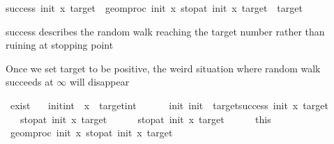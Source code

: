 \begin{isabellebody}
{\isachardoublequoteopen}success\ init\ x\ target\ {\isacharequal}{\kern0pt}\ {\isacharparenleft}{\kern0pt}geom{\isacharunderscore}{\kern0pt}proc\ init\ x\ {\isacharparenleft}{\kern0pt}stop{\isacharunderscore}{\kern0pt}at\ init\ x\ target{\isacharparenright}{\kern0pt}\ {\isacharequal}{\kern0pt}\ target{\isacharparenright}{\kern0pt}{\isachardoublequoteclose}%
\begin{isamarkuptext}%
success describes the random walk reaching the target number rather than ruining at stopping point%
\end{isamarkuptext}\isamarkuptrue%
%
\isadelimdocument
%
\endisadelimdocument
%
\isatagdocument
%
\isamarkuptrue%
%
\isamarkuptrue%
%
\endisatagdocument
{\isafolddocument}%
%
\isadelimdocument
%
\endisadelimdocument
%
\begin{isamarkuptext}%
Once we set target to be positive, the weird situation where random walk succeeds at $\infty$ will disappear%
\end{isamarkuptext}\isamarkuptrue%
\isamarkupfalse%
\ exist{\isacharcolon}{\kern0pt}\isanewline
\ \ \ init{\isacharcolon}{\kern0pt}{\isacharcolon}{\kern0pt}int\ \ x\ \ target{\isacharcolon}{\kern0pt}{\isacharcolon}{\kern0pt}int\ \isanewline
\ \ \ {\isachardoublequoteopen}{}\ {\isasymle}\ init{\isachardoublequoteclose}\ {\isachardoublequoteopen}init\ {\isasymle}\ target{\isachardoublequoteclose}{\isachardoublequoteopen}success\ init\ x\ target{\isachardoublequoteclose}\isanewline
\ \ \ {\isachardoublequoteopen}stop{\isacharunderscore}{\kern0pt}at\ init\ x\ target\ {\isasymnoteq}\ {\isasyminfinity}{\isachardoublequoteclose}\isanewline
%
\isadelimproof
%
\endisadelimproof
%
\isatagproof
{}\isamarkupfalse%
\isanewline
\ \ \isamarkupfalse%
\ {\isachardoublequoteopen}stop{\isacharunderscore}{\kern0pt}at\ init\ x\ target\ {\isacharequal}{\kern0pt}\ {\isasyminfinity}{\isachardoublequoteclose}\isanewline
\ \ \isamarkupfalse%
\ this\ \isamarkupfalse%
\ {\isachardoublequoteopen}geom{\isacharunderscore}{\kern0pt}proc\ init\ x\ {\isacharparenleft}{\kern0pt}stop{\isacharunderscore}{\kern0pt}at\ init\ x\ target{\isacharparenright}{\kern0pt}\ {\isacharequal}{\kern0pt}\ {\isacharminus}{\kern0pt}{}{\isachardoublequoteclose}\isanewline
\ \ \ \ \isamarkupfalse%

\end{isabellebody}
